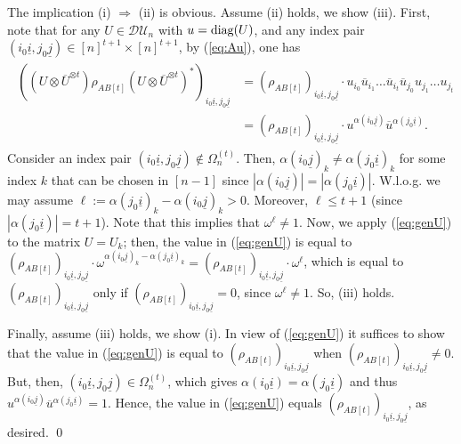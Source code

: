 \documentclass[11pt]{article}
\makeatletter
\newcommand{\T}{\ensuremath{\mathbb{T}}} %
\newcommand{\MDU}{{\mathcal {DU}}}
\newcommand{\CLDUI}{\text{\rm CLDUI}}
\newcommand{\ou}{\overline u}
\newcommand{\diag}{\text{\rm diag}}
\newcommand{\ot}{\otimes}
\newcommand{\ui}{\underline{i}}
\newcommand{\uj}{\underline{j}}
\newcommand{\ovU}{\overline U}
\theoremstyle{plain}
\renewenvironment{proof}[1][\proofname]{%
  \par
  \pushQED{}%
  \normalfont
  \topsep6\p@\@plus6\p@
  \trivlist
  \item[\hskip\labelsep\itshape #1\@addpunct{.}]%
}{%
  \popQED
  \endtrivlist
}
\makeatother
\begin{document}
\begin{proof}
The implication (i) $\Longrightarrow $ (ii) is obvious. %
Assume (ii) holds, we show (iii).
First, note that for any 
 $U\in\MDU_n$ with $u=\diag(U)$,  and any index  pair $(i_0\ui,j_0\uj)\in [n]^{t+1}\times [n]^{t+1}$, by (\ref{eq:Au}), one has
  \begin{align}\label{eq:genU}
  \begin{split}
  ((U\ot \ovU^{\ot t}) \rho_{AB[t]} (U\ot \ovU^{\ot t})^*)_{i_0\ui,j_0\uj}
  & =
(\rho_{AB[t]})_{i_0\ui,j_0\uj} \cdot u_{i_0}\ou_{i_1}\dots\ou_{i_t}\ou_{j_0}u_{j_1}\dots u_{j_t}\\
& = (\rho_{AB[t]})_{i_0\ui,j_0\uj} \cdot u^{\alpha(i_0\uj)} \overline u^{\alpha(j_0\ui)}.
\end{split}
\end{align}
Consider an index pair $(i_0\ui, j_0\uj)\not\in \Omega^{(t)}_n$. 
   Then, %
    $\alpha(i_0\uj)_k\ne \alpha(j_0\ui)_k$ for some index $k$ that can be chosen in $[n-1]$ since $|\alpha(i_0\uj)|=|\alpha(j_0\ui)|$.
 W.l.o.g. we may assume $\ell:= \alpha(j_0\ui)_k- \alpha(i_0\uj)_k>0$. Moreover, $\ell \le t+1$ (since $|\alpha(j_0\ui)|=t+1$). Note that this implies that $\omega^\ell\ne 1$. 
Now, we apply (\ref{eq:genU}) to the matrix $U=U_k$; then, the value in (\ref{eq:genU}) is equal to 
$(\rho_{AB[t]})_{i_0\ui,j_0\uj} \cdot \omega^{\alpha(i_0\uj)_k-\alpha(j_0\ui)_k}=  (\rho_{AB[t]})_{i_0\ui,j_0\uj} \cdot \omega^\ell$, which is equal to   $(\rho_{AB[t]})_{i_0\ui,j_0\uj}$  only if   $(\rho_{AB[t]})_{i_0\ui,j_0\uj}=0$, since $\omega^\ell\ne 1$. So, (iii) holds.

 Finally, assume (iii) holds, we show (i). In view of (\ref{eq:genU}) it suffices to show that the value in (\ref{eq:genU}) is equal to $(\rho_{AB[t]})_{i_0\ui,j_0\uj}$ when $(\rho_{AB[t]})_{i_0\ui,j_0\uj} \ne 0$. But, then,  $(i_0\ui,j_0\uj)\in \Omega_n^{(t)}$, which gives $\alpha(i_0\ui)=\alpha(j_0\ui)$ and thus 
 $u^{\alpha(i_0\uj)} \overline u^{\alpha(j_0\ui)}=1$. Hence, the value in (\ref{eq:genU})  equals
  $(\rho_{AB[t]})_{i_0\ui,j_0\uj}$, as desired.
\qed\end{proof}
\end{document}
